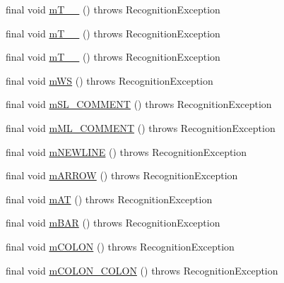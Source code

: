 \begin{DoxyCompactItemize}
\item 
final void \hyperlink{classorg_1_1tzi_1_1use_1_1parser_1_1shell_1_1_shell_command_lexer_a8d527fa675b2aff5b25467ccd34723cc}{m\-T\-\_\-\-\_} ()  throws Recognition\-Exception 
\item 
final void \hyperlink{classorg_1_1tzi_1_1use_1_1parser_1_1shell_1_1_shell_command_lexer_a5df18798c52d01ecc30354aefac25037}{m\-T\-\_\-\-\_} ()  throws Recognition\-Exception 
\item 
final void \hyperlink{classorg_1_1tzi_1_1use_1_1parser_1_1shell_1_1_shell_command_lexer_a8c757842f747823622c665e443c6d7fa}{m\-T\-\_\-\-\_} ()  throws Recognition\-Exception 
\item 
final void \hyperlink{classorg_1_1tzi_1_1use_1_1parser_1_1shell_1_1_shell_command_lexer_a6f38128e1945cbfbc15c1f193560b7ff}{m\-W\-S} ()  throws Recognition\-Exception 
\item 
final void \hyperlink{classorg_1_1tzi_1_1use_1_1parser_1_1shell_1_1_shell_command_lexer_ae4d23ed34dbbea83111c5a9669ccdd59}{m\-S\-L\-\_\-\-C\-O\-M\-M\-E\-N\-T} ()  throws Recognition\-Exception 
\item 
final void \hyperlink{classorg_1_1tzi_1_1use_1_1parser_1_1shell_1_1_shell_command_lexer_ae7e73021b5c060a0dc55873fb18b5c53}{m\-M\-L\-\_\-\-C\-O\-M\-M\-E\-N\-T} ()  throws Recognition\-Exception 
\item 
final void \hyperlink{classorg_1_1tzi_1_1use_1_1parser_1_1shell_1_1_shell_command_lexer_a6ad9053ec2d98ced3c379b36a7bb6cc2}{m\-N\-E\-W\-L\-I\-N\-E} ()  throws Recognition\-Exception 
\item 
final void \hyperlink{classorg_1_1tzi_1_1use_1_1parser_1_1shell_1_1_shell_command_lexer_acfe574cab7921b5c6fc3bc8f7057fa17}{m\-A\-R\-R\-O\-W} ()  throws Recognition\-Exception 
\item 
final void \hyperlink{classorg_1_1tzi_1_1use_1_1parser_1_1shell_1_1_shell_command_lexer_ad7aa8b2d3b0d0d7bc6364d138d70907e}{m\-A\-T} ()  throws Recognition\-Exception 
\item 
final void \hyperlink{classorg_1_1tzi_1_1use_1_1parser_1_1shell_1_1_shell_command_lexer_a35d837daef590a754812d6f5772f2a82}{m\-B\-A\-R} ()  throws Recognition\-Exception 
\item 
final void \hyperlink{classorg_1_1tzi_1_1use_1_1parser_1_1shell_1_1_shell_command_lexer_ac177b8a64270b4a7e6ddab40c2765600}{m\-C\-O\-L\-O\-N} ()  throws Recognition\-Exception 
\item 
final void \hyperlink{classorg_1_1tzi_1_1use_1_1parser_1_1shell_1_1_shell_command_lexer_acaf0e430d5b88d874f032c018e0b7c1d}{m\-C\-O\-L\-O\-N\-\_\-\-C\-O\-L\-O\-N} ()  throws Recognition\-Exception 

\end{DoxyCompactItemize}
